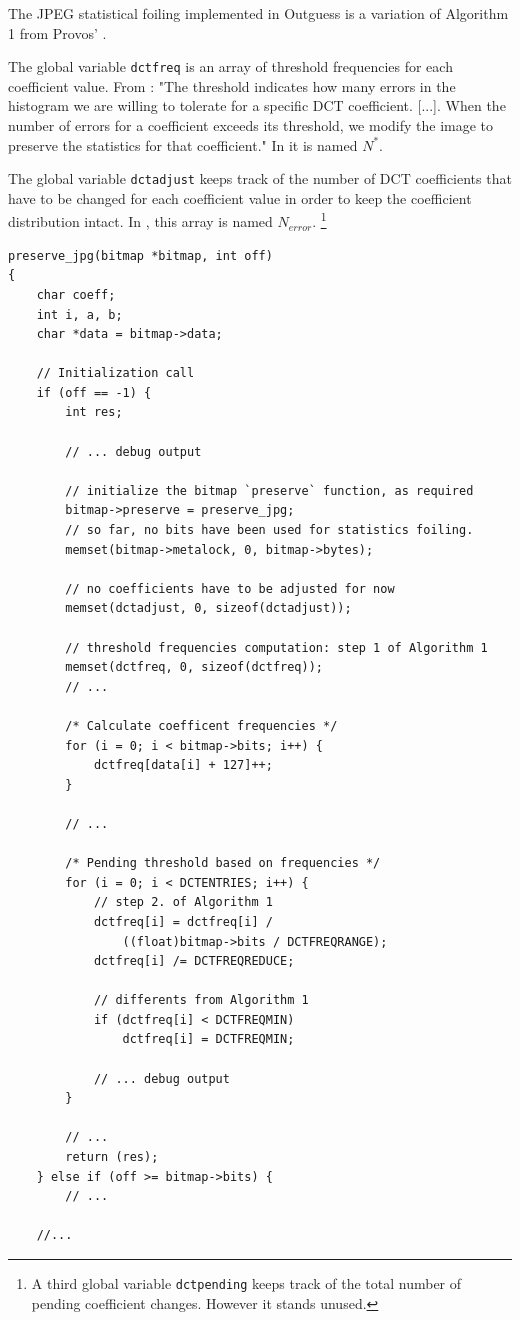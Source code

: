 \documentclass{article}
\begin{document}
The JPEG statistical foiling implemented in Outguess is a variation of Algorithm 1 from Provos' \cite{def01}.

The global variable \texttt{dctfreq} is an array of threshold frequencies for each coefficient value. From \cite{def01}: "The threshold indicates how many errors in the histogram we are willing to tolerate for a specific DCT coefficient. [...]. When the number of errors for a coefficient exceeds its threshold, we modify the image to preserve the statistics for that coefficient." In \cite{def01} it is named $N^\ast$.

The global variable \texttt{dctadjust} keeps track of the number of DCT coefficients that have to be changed for each coefficient value in order to keep the coefficient distribution intact. In \cite{def01}, this array is named $N_{error}$. \footnote{A third global variable \texttt{dctpending} keeps track of the total number of pending coefficient changes. However it stands unused.}

\begin{verbatim}
preserve_jpg(bitmap *bitmap, int off)
{
	char coeff;
	int i, a, b;
	char *data = bitmap->data;
	
	// Initialization call
	if (off == -1) {
		int res;
		
		// ... debug output
		
		// initialize the bitmap `preserve` function, as required
		bitmap->preserve = preserve_jpg;
		// so far, no bits have been used for statistics foiling.
		memset(bitmap->metalock, 0, bitmap->bytes);
		
		// no coefficients have to be adjusted for now
		memset(dctadjust, 0, sizeof(dctadjust));

		// threshold frequencies computation: step 1 of Algorithm 1
		memset(dctfreq, 0, sizeof(dctfreq));
		// ...
		
		/* Calculate coefficent frequencies */
		for (i = 0; i < bitmap->bits; i++) {
			dctfreq[data[i] + 127]++;
		}
		
		// ...

		/* Pending threshold based on frequencies */
		for (i = 0; i < DCTENTRIES; i++) {
			// step 2. of Algorithm 1
			dctfreq[i] = dctfreq[i] /
				((float)bitmap->bits / DCTFREQRANGE);
			dctfreq[i] /= DCTFREQREDUCE;

			// differents from Algorithm 1
			if (dctfreq[i] < DCTFREQMIN)
				dctfreq[i] = DCTFREQMIN;
	
			// ... debug output
		}
		
		// ...
		return (res);
	} else if (off >= bitmap->bits) {
		// ...
		
	//...
\end{verbatim}
\end{document}
